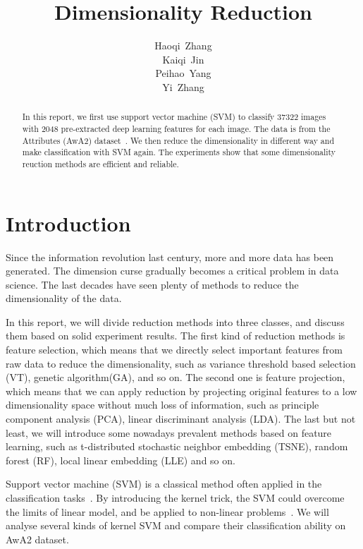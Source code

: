 \documentclass{article}
\title{Dimensionality Reduction}
\author{
  Haoqi~Zhang\\
  \And
  Kaiqi~Jin\\
  \And
  Peihao~Yang\\
  \And
  Yi~Zhang\\
}
\begin{document}
\maketitle

\begin{abstract}
In this report, we first use support vector machine (SVM) to classify 37322 images with 2048 pre-extracted deep learning features for each image. The data is from the Attributes (AwA2) dataset~\cite{awa2}. We then reduce the dimensionality in different way and make classification with SVM again. The experiments show that some dimensionality reuction methods are efficient and reliable.
\end{abstract}




\section{Introduction}
Since the information revolution last century, more and more data has been generated. The dimension curse gradually becomes a critical problem in data science. The last decades have seen plenty of methods to reduce the dimensionality of the data. 

In this report, we will divide reduction methods into three classes, and discuss them based on solid experiment results. The first kind of reduction methods is feature selection, which means that we directly select important features from raw data to reduce the dimensionality, such as variance threshold based selection (VT), genetic algorithm(GA), and so on. The second one is feature projection, which means that we can apply reduction by projecting original features to a low dimensionality space without much loss of information, such as principle component analysis (PCA), linear discriminant analysis (LDA). The last but not least, we will introduce some nowadays prevalent methods based on feature learning, such as t-distributed stochastic neighbor embedding (TSNE), random forest (RF), local linear embedding (LLE) and so on.

Support vector machine (SVM) is a classical method often applied in the classification tasks~\cite{SVM}. By introducing the kernel trick, the SVM could overcome the limits of linear model, and be applied to non-linear problems~\cite{kernel}. We will analyse several kinds of kernel SVM and compare their classification ability on AwA2 dataset.
\end{document}
